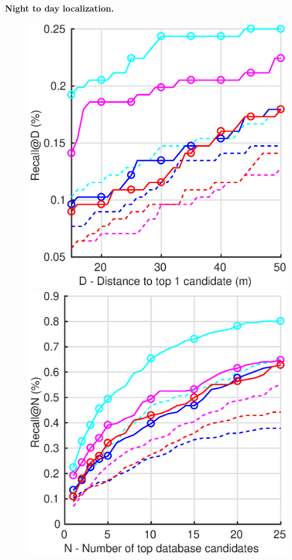 \noindent\textbf{Night to day localization.}
\begin{figure}
	\center
	\begin{minipage}{0.49\linewidth}
		\includegraphics[width=\linewidth]{plot/fig/nightft_distance}	
	\end{minipage}
	\begin{minipage}{0.49\linewidth}
		\includegraphics[width=\linewidth]{plot/fig/nightft_recall}	
	\end{minipage}
	

\end{figure}
